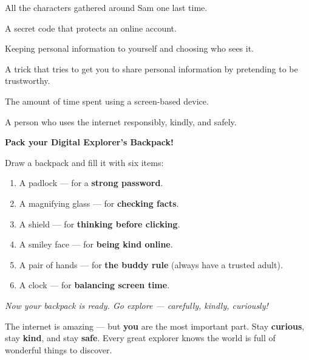 All the characters gathered around Sam one last time.



\sectionrule

\begin{newwords}
  \begin{description}[labelwidth=3.2cm, leftmargin=3.4cm]
    \item[\term{Password}]       A secret code that protects an online account.
    \item[\term{Privacy}]        Keeping personal information to yourself and choosing who sees it.
    \item[\term{Phishing}]       A trick that tries to get you to share personal information by pretending to be trustworthy.
    \item[\term{Screen time}]    The amount of time spent using a screen-based device.
    \item[\term{Digital citizen}] A person who uses the internet responsibly, kindly, and safely.
  \end{description}
\end{newwords}

\sectionrule

\begin{tryit}
  \textbf{Pack your Digital Explorer's Backpack!}

  Draw a backpack and fill it with six items:
  \begin{enumerate}
    \item A padlock — for a \textbf{strong password}.
    \item A magnifying glass — for \textbf{checking facts}.
    \item A shield — for \textbf{thinking before clicking}.
    \item A smiley face — for \textbf{being kind online}.
    \item A pair of hands — for \textbf{the buddy rule} (always have a trusted adult).
    \item A clock — for \textbf{balancing screen time}.
  \end{enumerate}

  \emph{Now your backpack is ready.  Go explore — carefully, kindly, curiously!}
\end{tryit}

\sectionrule

\begin{bigidea}
  The internet is amazing — but \textbf{you} are the most important part.
  Stay \textbf{curious}, stay \textbf{kind}, and stay \textbf{safe}.
  Every great explorer knows the world is full of wonderful things to discover.
\end{bigidea}
